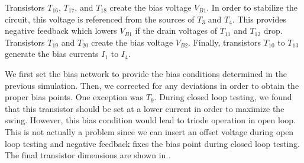 \documentclass[journal,hidelinks]{IEEEtran}
\begin{document}
Transistors $T_{16}$, $T_{17}$, and $T_{18}$ create the bias voltage $V_{B1}$. In order to stabilize the circuit, this voltage is referenced from the sources of $T_3$ and $T_4$. This provides negative feedback which lowers $V_{B1}$ if the drain voltages of $T_{11}$ and $T_{12}$ drop. Transistors $T_{19}$ and $T_{20}$ create the bias voltage $V_{B2}$. Finally, transistors $T_{10}$ to $T_{13}$ generate the bias currents $I_1$ to $I_4$.

We first set the bias network to provide the bias conditions determined in the previous simulation. Then, we corrected for any deviations in order to obtain the proper bias points. One exception was $T_9$. During closed loop testing, we found that this transistor should be set at a lower current in order to maximize the swing. However, this bias condition would lead to triode operation in open loop. This is not actually a problem since we can insert an offset voltage during open loop testing and negative feedback fixes the bias point during closed loop testing. The final transistor dimensions are shown in .

\begin{table}[!htb]
  \centering
  \caption{Final transistor dimensions (Part 1).}
  \label{tab:dim-final-1}
\end{table}

\begin{table}[!htb]
  \centering
  \caption{Final transistor dimensions (Part 2).}
  \label{tab:dim-final-2}
\end{table}
\end{document}
